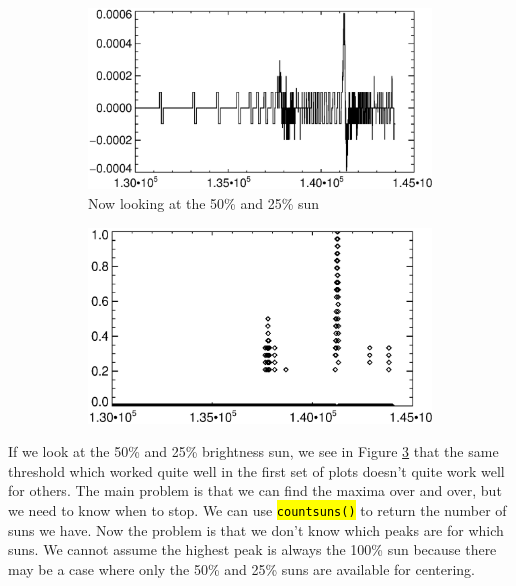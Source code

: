 \documentclass[10pt]{scrartcl}
\begin{document}
\begin{figure}[!h]
\begin{center}
   \begin{subfigure}[b]{.49\textwidth}
        \centering
        \includegraphics[width=1.\textwidth]{../plots_tables_images/reg23.eps}
        \caption{Now looking at the 50\% and 25\% sun}
        \label{reg23peaks}
    \end{subfigure}
    \begin{subfigure}[b]{.49\textwidth}
        \centering
        \includegraphics[width=1.\textwidth]{../plots_tables_images/scaledreg23.eps}
        \caption{}
        \label{scaled23peaks}
    \end{subfigure}
    \caption{}
    \end{center}
\end{figure}


If we look at the 50\% and 25\% brightness sun, we see in Figure \ref{scaled23peaks} that the same threshold which worked quite well in the first set of plots doesn't quite work well for others. The main problem is that we can find the maxima over and over, but we need to know when to stop. We can use \hl{\texttt{countsuns()}} to return the number of suns we have. Now the problem is that we don't know which peaks are for which suns. We cannot assume the highest peak is always the 100\% sun because there may be a case where only the 50\% and 25\% suns are available for centering. \\
\end{document}
